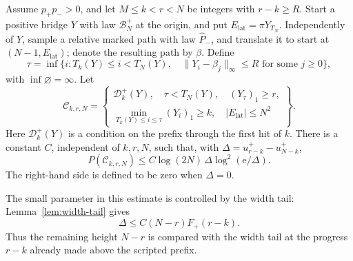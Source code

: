 \begin{proposition}
\label{prop:first-contact}
Assume \(p_+p_->0\), and let \(M\le k<r<N\) be integers with
\(r-k\ge R\).  Start a positive bridge \(Y\) with law
\(\mathcal B_N^+\) at the origin, and put
\(E_{\mathrm{lat}}=\pi Y_{T_N}\).
Independently of \(Y\), sample a relative marked path with law
\(\widehat P_-\), and translate it to start at
\((N-1,E_{\mathrm{lat}})\); denote the resulting path by \(\beta\).
Define
\[
 \tau=\inf\{i:T_k(Y)\le i<T_N(Y),\quad
       \|Y_i-\beta_j\|_\infty\le R\text{ for some }j\ge0\},
\]
with \(\inf\varnothing=\infty\).  Let
\begin{equation}\label{eq:first-contact-event}
 \mathcal C_{k,r,N}=
 \left\{
 \begin{gathered}
  \mathcal D_k^+(Y),\quad \tau<T_N(Y),\quad (Y_\tau)_1\ge r,\\
  \min_{T_k(Y)\le i\le\tau}(Y_i)_1\ge k,
  \quad |E_{\mathrm{lat}}|\le N^2
 \end{gathered}
 \right\}.
\end{equation}
Here \(\mathcal D_k^+(Y)\) is a condition on the prefix through the
first hit of \(k\).  There is a constant \(C\), independent of
\(k,r,N\), such that, with
\(\Delta=u_{r-k}^+-u_{N-k}^+\),
\begin{equation}\label{eq:first-contact-bound}
 P(\mathcal C_{k,r,N})
 \le C\log(2N)\,\Delta\log^2(\mathrm e/\Delta).
\end{equation}
The right-hand side is defined to be zero when \(\Delta=0\).
\end{proposition}

The small parameter in this estimate is controlled by the width tail:
Lemma~\ref{lem:width-tail} gives
\[
 \Delta\le C(N-r)F_+(r-k).
\]
Thus the remaining height \(N-r\) is compared with the width tail at
the progress \(r-k\) already made above the scripted prefix.

